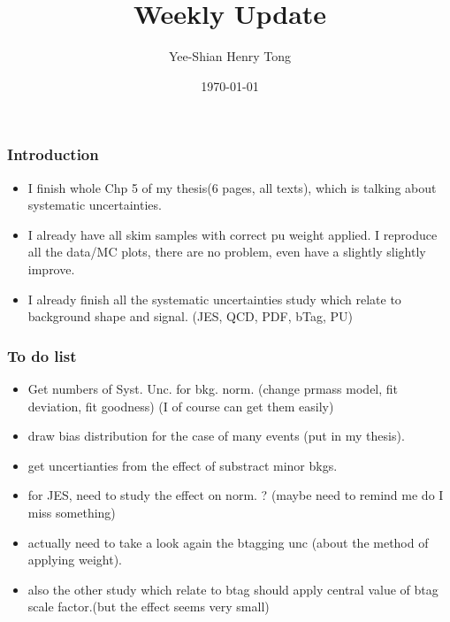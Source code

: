\documentclass{beamer}
\title[]{Weekly Update} %
\author[Henry Tong]{Yee-Shian Henry Tong} %
\institute[NCU]{ %
  National Central University \\ %
  \medskip
  \textit{NCU HEP Group Meeting} %
}
\date{\today} %
\begin{document}
\begin{frame}
  \vspace*{-1cm}
  \enlargethispage{1cm}
  \titlepage %
\end{frame}


\begin{frame}
  \frametitle{Introduction}
  \justifying
  \begin{itemize}
  \item I finish whole Chp 5 of my thesis(6 pages, all texts), which is talking about systematic uncertainties.
  \item I already have all skim samples with correct pu weight applied. I reproduce all the data/MC plots, there are no problem, even have a slightly slightly improve.
  \item I already finish all the systematic uncertainties study which relate to background shape and signal. (JES, QCD, PDF, bTag, PU)
  \end{itemize}
\end{frame}

\begin{frame}
  \frametitle{To do list}
  \justifying
  \begin{itemize}
  \item Get numbers of Syst. Unc. for bkg. norm. (change prmass model, fit deviation, fit goodness) (I of course can get them easily)
  \item draw bias distribution for the case of many events (put in my thesis).
  \item get uncertianties from the effect of substract minor bkgs.
  \item for JES, need to study the effect on norm. ? (maybe need to remind me do I miss something)
  \item actually need to take a look again the btagging unc (about the method of applying weight).
  \item also the other study which relate to btag should apply central value of btag scale factor.(but the effect seems very small)
  \end{itemize}
\end{frame}
\end{document}
